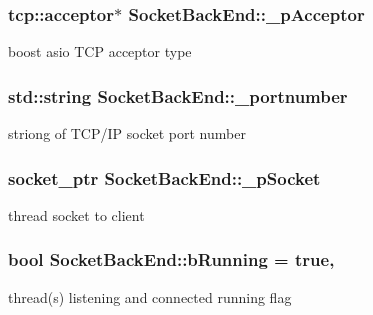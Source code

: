 \subsubsection[{\+\_\+p\+Acceptor}]{\setlength{\rightskip}{0pt plus 5cm}tcp\+::acceptor$\ast$ Socket\+Back\+End\+::\+\_\+p\+Acceptor\hspace{0.3cm}{\ttfamily [protected]}}\label{class_socket_back_end_a7c776294a4bb5a58510e64e7d53cc014}
boost asio T\+C\+P acceptor type \hypertarget{class_socket_back_end_a94686a8ef210b5e12c1233d297094e5b}{}
\subsubsection[{\+\_\+portnumber}]{\setlength{\rightskip}{0pt plus 5cm}std\+::string Socket\+Back\+End\+::\+\_\+portnumber\hspace{0.3cm}{\ttfamily [protected]}}\label{class_socket_back_end_a94686a8ef210b5e12c1233d297094e5b}
striong of T\+C\+P/\+I\+P socket port number \hypertarget{class_socket_back_end_ad1378d92058b61576590bf220b8ee43e}{}
\subsubsection[{\+\_\+p\+Socket}]{\setlength{\rightskip}{0pt plus 5cm}socket\+\_\+ptr Socket\+Back\+End\+::\+\_\+p\+Socket\hspace{0.3cm}{\ttfamily [protected]}}\label{class_socket_back_end_ad1378d92058b61576590bf220b8ee43e}
thread socket to client \hypertarget{class_socket_back_end_ae3ab62a2f4fe7fed700b875f9f7ff30c}{}
\subsubsection[{b\+Running}]{\setlength{\rightskip}{0pt plus 5cm}bool Socket\+Back\+End\+::b\+Running = true\hspace{0.3cm}{\ttfamily [static]}, {\ttfamily [protected]}}\label{class_socket_back_end_ae3ab62a2f4fe7fed700b875f9f7ff30c}
thread(s) listening and connected running flag \hypertarget{class_socket_back_end_a4c78e1cdf4cf31d732861f26744618c7}{}
